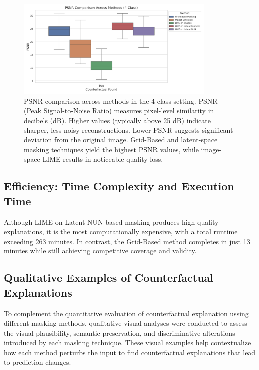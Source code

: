 \begin{figure}[htbp]
    \centering
    \includegraphics[width=0.85\textwidth]{img/masking_results/psnr_boxplot_4_class.png}
    \caption{
        PSNR comparison across methods in the 4-class setting. PSNR (Peak Signal-to-Noise Ratio) measures pixel-level similarity in decibels (dB). Higher values (typically above 25 dB) indicate sharper, less noisy reconstructions. Lower PSNR suggests significant deviation from the original image. Grid-Based and latent-space masking techniques yield the highest PSNR values, while image-space LIME results in noticeable quality loss.
    }
    \label{fig:psnr_boxplot}
\end{figure}


\vspace{1em}


\subsection{Efficiency: Time Complexity and Execution Time}
Although LIME on Latent NUN based masking produces high-quality explanations, it is the most computationally expensive, with a total runtime exceeding 263 minutes. In contrast, the Grid-Based method completes in just 13 minutes while still achieving competitive coverage and validity.



\subsection{Qualitative Examples of Counterfactual Explanations} \label{subsubsec:qualitative_examples}
To complement the quantitative evaluation of counterfactual explanation ussing different masking methods, qualitative visual analyses were conducted to assess the visual plausibility, semantic preservation, and discriminative alterations introduced by each masking technique. These visual examples help contextualize how each method perturbs the input to find counterfactual explanations that lead to prediction changes.

